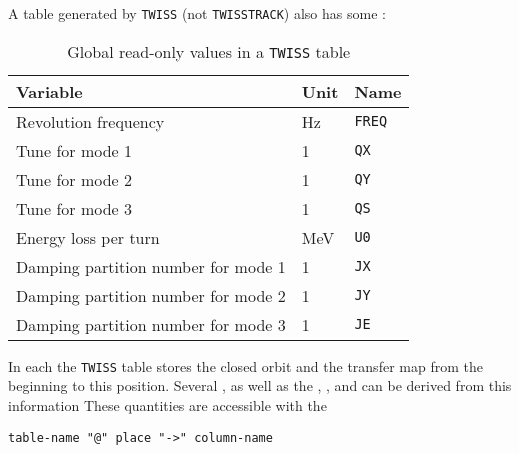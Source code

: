 A table generated by \texttt{TWISS} (not \texttt{TWISSTRACK})
also has some :
\begin{table}[Ht]
  \caption{Global read-only values in a \texttt{TWISS} table}
  \label{tab:twiss-glob}
  \begin{center}
    \begin{tabular}{|l|l|l|}
      \hline
      Variable & Unit & Name \\
      \hline
      Revolution frequency & Hz & \texttt{FREQ}\index{FREQ} \\
      Tune for mode 1 & 1 & \texttt{QX}\index{QX} \\
      Tune for mode 2 & 1 & \texttt{QY}\index{QY} \\
      Tune for mode 3 & 1 & \texttt{QS}\index{QS} \\
      Energy loss per turn & MeV & \texttt{U0}\index{U0} \\
      Damping partition number for mode 1 & 1 & \texttt{JX}\index{JX} \\
      Damping partition number for mode 2 & 1 & \texttt{JY}\index{JY} \\
      Damping partition number for mode 3 & 1 & \texttt{JE}\index{JE} \\
      \hline
    \end{tabular}
  \end{center}
\end{table}

In each the \texttt{TWISS} table stores the closed orbit and the
transfer map from the beginning to this position.
Several ,
as well as the ,
,
and  can be derived from this
information
These quantities are accessible with the 
\begin{verbatim}
table-name "@" place "->" column-name
\end{verbatim}

